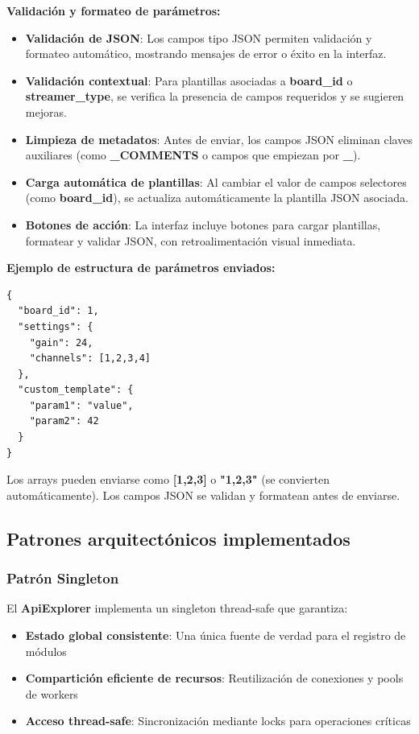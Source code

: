 \textbf{Validación y formateo de parámetros:}
\begin{itemize}
    \item \textbf{Validación de JSON}: Los campos tipo JSON permiten validación y formateo automático, mostrando mensajes de error o éxito en la interfaz.
    \item \textbf{Validación contextual}: Para plantillas asociadas a \textbf{board\_id} o \textbf{streamer\_type}, se verifica la presencia de campos requeridos y se sugieren mejoras.
    \item \textbf{Limpieza de metadatos}: Antes de enviar, los campos JSON eliminan claves auxiliares (como \textbf{\_COMMENTS} o campos que empiezan por \textbf{\_}).
    \item \textbf{Carga automática de plantillas}: Al cambiar el valor de campos selectores (como \textbf{board\_id}), se actualiza automáticamente la plantilla JSON asociada.
    \item \textbf{Botones de acción}: La interfaz incluye botones para cargar plantillas, formatear y validar JSON, con retroalimentación visual inmediata.
\end{itemize}

\textbf{Ejemplo de estructura de parámetros enviados:}
\begin{verbatim}
{
  "board_id": 1,
  "settings": {
    "gain": 24,
    "channels": [1,2,3,4]
  },
  "custom_template": {
    "param1": "value",
    "param2": 42
  }
}
\end{verbatim}
Los arrays pueden enviarse como \textbf{[1,2,3]} o \textbf{"1,2,3"} (se convierten automáticamente). Los campos JSON se validan y formatean antes de enviarse.

\subsection{Patrones arquitectónicos implementados}
\label{subsec:patrones_api_explorer}

\subsubsection{Patrón Singleton}
El \textbf{ApiExplorer} implementa un singleton thread-safe que garantiza:
\begin{itemize}
    \item \textbf{Estado global consistente}: Una única fuente de verdad para el registro de módulos
    \item \textbf{Compartición eficiente de recursos}: Reutilización de conexiones y pools de workers
    \item \textbf{Acceso thread-safe}: Sincronización mediante locks para operaciones críticas
\end{itemize}

